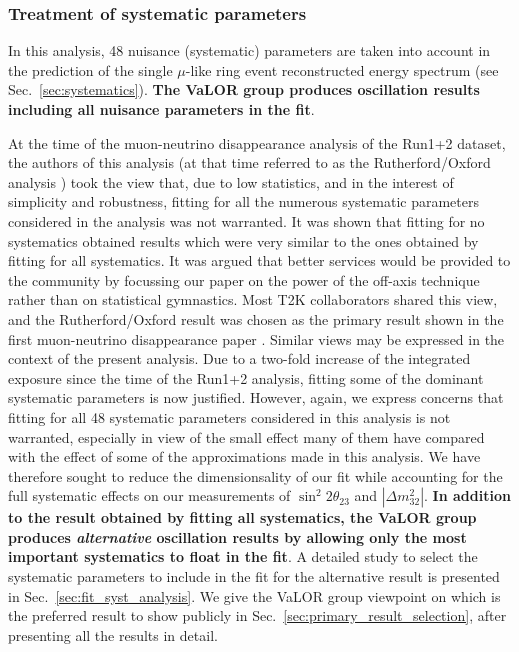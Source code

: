 
\subsubsection {Treatment of systematic parameters}
\label{sec:oscfit_method_nuisance}

In this analysis, 48 nuisance (systematic) parameters are taken into account 
in the prediction of the single $\mu$-like ring event reconstructed energy spectrum (see Sec.\ \ref{sec:systematics}).
{\bf The VaLOR group produces oscillation results including all nuisance parameters in the fit}.

At the time of the muon-neutrino disappearance analysis of the Run1+2 dataset, 
the authors of this analysis (at that time referred to as the Rutherford/Oxford analysis \cite{OurRun12DisappAnalysis}) 
took the view that, due to low statistics, and in the interest of simplicity and robustness, 
fitting for all the numerous systematic parameters considered in the analysis was not warranted.
It was shown that fitting for no systematics obtained results which were very similar to the ones
obtained by fitting for all systematics.
It was argued that better services would be provided to the community by focussing our paper on the
power of the off-axis technique rather than on statistical gymnastics.
Most T2K collaborators shared this view, and the Rutherford/Oxford result was chosen as the
primary result shown in the first muon-neutrino disappearance paper \cite{T2KRun12Disapp}.
Similar views may be expressed in the context of the present analysis.
Due to a two-fold increase of the integrated exposure since the time of the Run1+2 analysis,
fitting some of the dominant systematic parameters is now justified.
However, again, we express concerns that fitting for all 48 systematic parameters 
considered in this analysis is not warranted,
especially in view of the small effect many of them have 
compared with the effect of some of the approximations made in this analysis.
We have therefore sought to reduce the dimensionsality of our fit
while accounting for the full systematic effects on our measurements of
$\sin^{2}{2\theta_{23}}$ and $|\Delta m^{2}_{32}|$. 
{\bf In addition to the result obtained by fitting all systematics, 
the VaLOR group produces {\em alternative} oscillation results by allowing only 
the most important systematics to float in the fit}.
A detailed study to select the systematic parameters to include in the 
fit for the alternative result is presented in Sec.\ \ref{sec:fit_syst_analysis}.
We give the VaLOR group viewpoint on which is the preferred result to show publicly
in Sec.\ \ref{sec:primary_result_selection}, after presenting all the results in detail.

